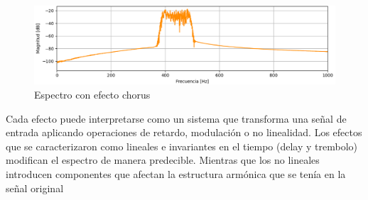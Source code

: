 \documentclass[12pt]{article}
\begin{document}
\begin{figure}[H]
    \centering
    \includegraphics[width=0.75\linewidth]{plot/chorus_efecto.png}
    \caption{Espectro con efecto chorus}
    \label{chorus_efecto}
\end{figure}

Cada efecto puede interpretarse como un sistema que transforma una señal de entrada aplicando operaciones de retardo, modulación o no linealidad. Los efectos que se caracterizaron como lineales e invariantes en el tiempo (delay y trembolo) modifican el espectro de manera predecible. Mientras que los no lineales introducen componentes que afectan la estructura armónica que se tenía en la señal original

\end{document}
